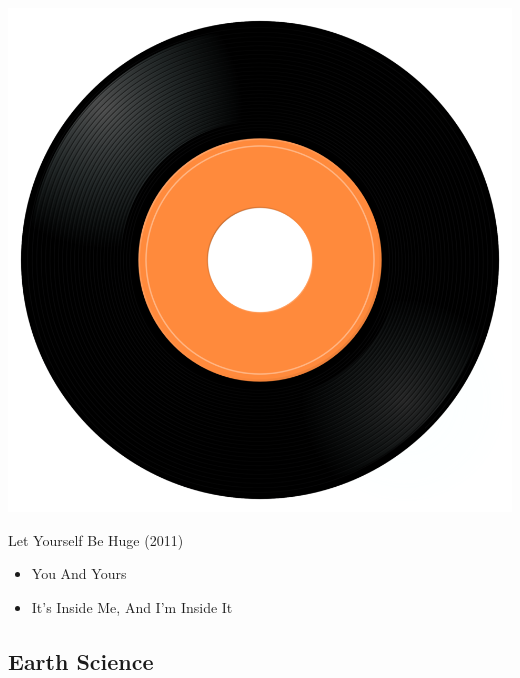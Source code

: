 \begin{minipage}[t]{0.25\textwidth}
\captionsetup{type=figure}
\includegraphics[width=\textwidth]{Images/cover.png}
\caption*{Let Yourself Be Huge (2011)}
\end{minipage}
\begin{minipage}[t]{0.25\textwidth}\vspace{0pt}
\begin{itemize}[nosep,leftmargin=1em,labelwidth=*,align=left]
	\setlength{\itemsep}{0pt}
	\item You And Yours
	\item It's Inside Me, And I'm Inside It
\end{itemize}
\end{minipage}

\subsection{Earth Science}


